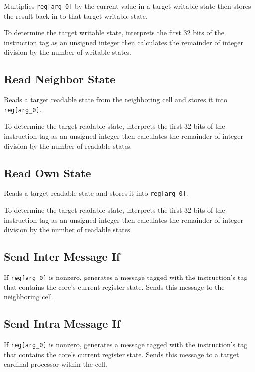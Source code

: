 
Multiplies \texttt{reg[arg\_0]} by the current value in a target writable state then stores the result back in to that target writable state.

To determine the target writable state, interprets the first 32 bits of the instruction tag as an unsigned integer then calculates the remainder of integer division by the number of writable states.

\subsection{Read Neighbor State}


Reads a target readable state from the neighboring cell and stores it into \texttt{reg[arg\_0]}.

To determine the target readable state, interprets the first 32 bits of the instruction tag as an unsigned integer then calculates the remainder of integer division by the number of readable states.

\subsection{Read Own State}


Reads a target readable state and stores it into \texttt{reg[arg\_0]}.

To determine the target readable state, interprets the first 32 bits of the instruction tag as an unsigned integer then calculates the remainder of integer division by the number of readable states.

\subsection{Send Inter Message If}


If \texttt{reg[arg\_0]} is nonzero, generates a message tagged with the instruction's tag that contains the core's current register state.
Sends this message to the neighboring cell.

\subsection{Send Intra Message If}


If \texttt{reg[arg\_0]} is nonzero, generates a message tagged with the instruction's tag that contains the core's current register state.
Sends this message to a target cardinal processor within the cell.

